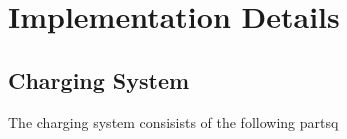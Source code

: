 \section{Implementation Details}
\subsection{Charging System}
The charging system consisists of the following partsq